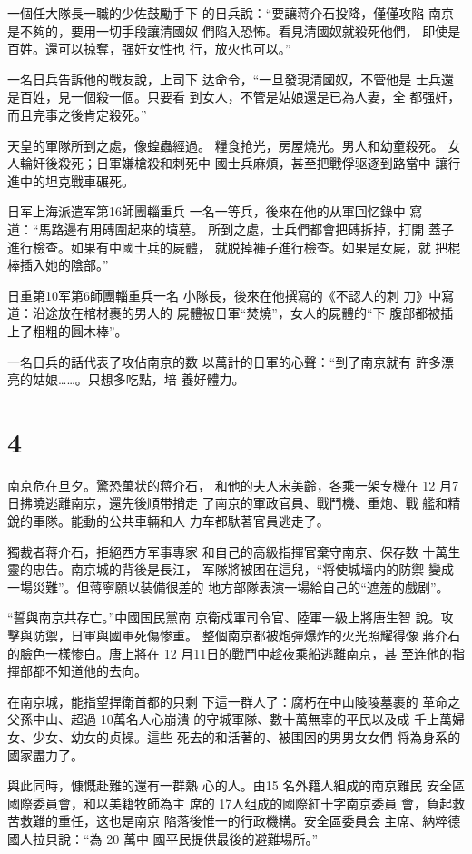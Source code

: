 \documentclass[12pt,UTF8]{ctexbook}
\begin{document}
一個任大隊長一職的少佐鼓勵手下
的日兵說：“要讓蒋介石投降，僅僅攻陷
南京是不夠的，要用一切手段讓清國奴
們陷入恐怖。看見清國奴就殺死他們，
即使是百姓。還可以掠奪，强奸女性也
行，放火也可以。”

一名日兵告訴他的戰友說，上司下
达命令，“一旦發現清國奴，不管他是
士兵還是百姓，見一個殺一個。只要看
到女人，不管是姑娘還是已為人妻，全
都强奸，而且完事之後肯定殺死。”

天皇的軍隊所到之處，像蝗蟲經過。
糧食抢光，房屋燒光。男人和幼童殺死。
女人輪奸後殺死；日軍嫌槍殺和刺死中
國士兵麻煩，甚至把戰俘驱逐到路當中
讓行進中的坦克戰車碾死。

日军上海派遣军第16師團輜重兵
一名一等兵，後來在他的从軍回忆錄中
寫道：“馬路邊有用磚圍起來的墳墓。
所到之處，士兵們都會把磚拆掉，打開
蓋子進行檢查。如果有中國士兵的屍體，
就脱掉褲子進行檢查。如果是女屍，就
把棍棒插入她的陰部。”

日重第10军第6師團輜重兵一名
小隊長，後來在他撰寫的《不認人的刺
刀》中寫道：沿途放在棺材裹的男人的
屍體被日軍“焚燒”，女人的屍體的“下
腹部都被插上了粗粗的圓木棒”。

一名日兵的話代表了攻佔南京的数
以萬計的日軍的心聲：“到了南京就有
許多漂亮的姑娘……。只想多吃點，培
養好體力。

\section{4}

南京危在旦夕。驚恐萬状的蒋介石，
和他的夫人宋美齡，各乘一架专機在 12
月7日拂曉逃離南京，還先後順带捎走
了南京的軍政官員、戰鬥機、重炮、戰
艦和精銳的軍隊。能動的公共車輛和人
力车都馱著官員逃走了。

獨裁者蒋介石，拒絕西方军事專家
和自己的高級指揮官棄守南京、保存数
十萬生靈的忠告。南京城的背後是長江，
军隊將被困在這兒，“将使城墙内的防禦
變成一場災難”。但蒋寧願以装備很差的
地方部隊表演一場給自己的“遮羞的戲剧”。

“誓與南京共存亡。”中國国民黨南
京衛戍軍司令官、陸軍一級上將唐生智
說。攻擊與防禦，日軍與國軍死傷惨重。
整個南京都被炮彈爆炸的火光照耀得像
蔣介石的臉色一樣惨白。唐上將在 12
月11日的戰鬥中趁夜乘船逃離南京，甚
至连他的指揮部都不知道他的去向。

在南京城，能指望捍衛首都的只剩
下這一群人了：腐朽在中山陵陵墓裹的
革命之父孫中山、超過 10萬名人心崩潰
的守城軍隊、數十萬無辜的平民以及成
千上萬婦女、少女、幼女的贞操。這些
死去的和活著的、被围困的男男女女們
将為身系的國家盡力了。

與此同時，慷慨赴難的還有一群熱
心的人。由15 名外籍人組成的南京難民
安全區國際委員會，和以美籍牧師為主
席的 17人组成的國際紅十字南京委員
會，負起救苦救難的重任，这也是南京
陷落後惟一的行政機構。安全區委員会
主席、納粹德國人拉貝說：“為 20 萬中
國平民提供最後的避難場所。”
\end{document}
